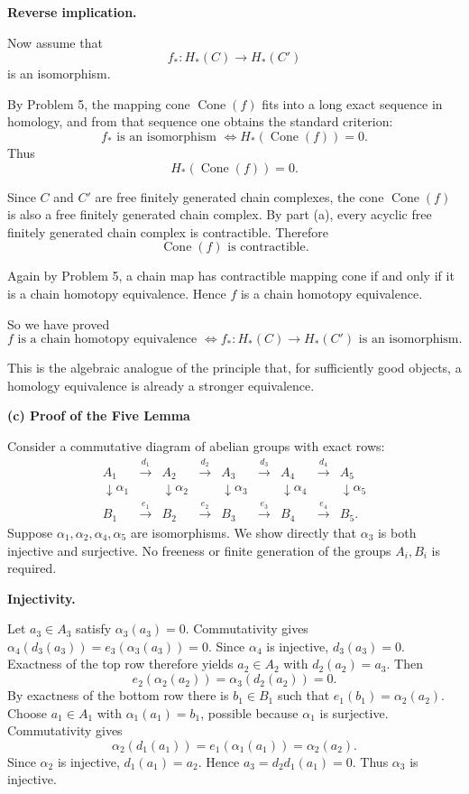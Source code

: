 \begin{solution}
\medskip
\noindent\textbf{Reverse implication.}\par
\smallskip

Now assume that
\[
f_*:H_*(C)\to H_*(C')
\]
is an isomorphism.

By Problem 5, the mapping cone \(\operatorname{Cone}(f)\) fits into a long exact sequence in homology, and from that sequence one obtains the standard criterion:
\[
f_* \text{ is an isomorphism } \Longleftrightarrow H_*(\operatorname{Cone}(f))=0.
\]
Thus
\[
H_*(\operatorname{Cone}(f))=0.
\]

Since \(C\) and \(C'\) are free finitely generated chain complexes, the cone \(\operatorname{Cone}(f)\) is also a free finitely generated chain complex. By part (a), every acyclic free finitely generated chain complex is contractible. Therefore
\[
\operatorname{Cone}(f)\text{ is contractible}.
\]

Again by Problem 5, a chain map has contractible mapping cone if and only if it is a chain homotopy equivalence. Hence \(f\) is a chain homotopy equivalence.

So we have proved
\[
\boxed{
	f \text{ is a chain homotopy equivalence }
	\Longleftrightarrow
	f_*:H_*(C)\to H_*(C') \text{ is an isomorphism}.
}
\]

This is the algebraic analogue of the principle that, for sufficiently good objects, a homology equivalence is already a stronger equivalence.


\medskip
\noindent\textbf{(c) Proof of the Five Lemma}\par
\smallskip

Consider a commutative diagram of abelian groups with exact rows:
\[
\begin{array}{ccccccccc}
 A_1&\xrightarrow{d_1}&A_2&\xrightarrow{d_2}&A_3&\xrightarrow{d_3}&A_4&\xrightarrow{d_4}&A_5\\
 \downarrow\alpha_1&&\downarrow\alpha_2&&\downarrow\alpha_3&&\downarrow\alpha_4&&\downarrow\alpha_5\\
 B_1&\xrightarrow{e_1}&B_2&\xrightarrow{e_2}&B_3&\xrightarrow{e_3}&B_4&\xrightarrow{e_4}&B_5.
\end{array}
\]
Suppose \(\alpha_1,\alpha_2,\alpha_4,\alpha_5\) are
isomorphisms. We show directly that \(\alpha_3\) is both injective
and surjective. No freeness or finite generation of the groups
\(A_i,B_i\) is required.

\medskip
\noindent\textbf{Injectivity.}\par\smallskip
Let \(a_3\in A_3\) satisfy \(\alpha_3(a_3)=0\).
Commutativity gives
\(\alpha_4(d_3(a_3))=e_3(\alpha_3(a_3))=0\).
Since \(\alpha_4\) is injective, \(d_3(a_3)=0\).
Exactness of the top row therefore yields \(a_2\in A_2\) with
\(d_2(a_2)=a_3\). Then
\[
e_2(\alpha_2(a_2))=\alpha_3(d_2(a_2))=0.
\]
By exactness of the bottom row there is \(b_1\in B_1\) such that
\(e_1(b_1)=\alpha_2(a_2)\).
Choose \(a_1\in A_1\) with \(\alpha_1(a_1)=b_1\), possible because
\(\alpha_1\) is surjective. Commutativity gives
\[
\alpha_2(d_1(a_1))=e_1(\alpha_1(a_1))=\alpha_2(a_2).
\]
Since \(\alpha_2\) is injective, \(d_1(a_1)=a_2\). Hence
\(a_3=d_2d_1(a_1)=0\). Thus \(\alpha_3\) is injective.


\end{solution}
